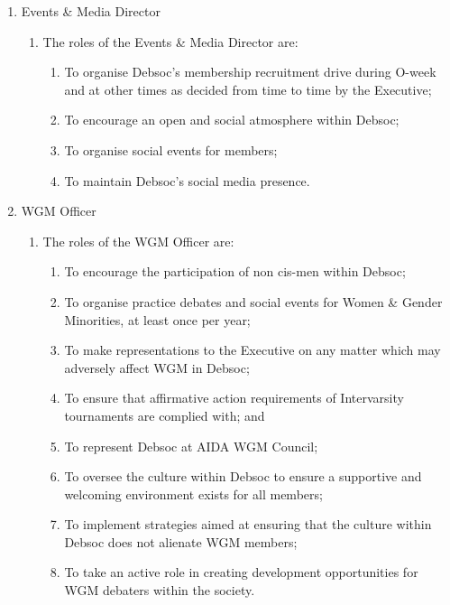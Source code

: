 \begin{enumerate}
\item Events \& Media Director
  \begin{enumerate}
  \item The roles of the Events \& Media Director are:
    \begin{enumerate}
    \item To organise Debsoc’s membership recruitment drive during O-week and at other times as decided from time to time by the Executive;
    \item To encourage an open and social atmosphere within Debsoc;
    \item To organise social events for members;
    \item To maintain Debsoc’s social media presence.
    \end{enumerate}
  \end{enumerate}

\item WGM Officer
  \begin{enumerate}
  \item The roles of the WGM Officer are:
    \begin{enumerate}
    \item To encourage the participation of non cis-men within Debsoc;
    \item To organise practice debates and social events for Women \& Gender Minorities, at least once per year;
    \item To make representations to the Executive on any matter which may adversely affect WGM in Debsoc;
    \item To ensure that affirmative action requirements of Intervarsity tournaments are complied with; and
    \item To represent Debsoc at AIDA WGM Council;
    \item To oversee the culture within Debsoc to ensure a supportive and welcoming environment exists for all members;
    \item To implement strategies aimed at ensuring that the culture within Debsoc does not alienate WGM members;
    \item To take an active role in creating development opportunities for WGM debaters within the society.
    \end{enumerate}
  \end{enumerate}


\end{enumerate}
